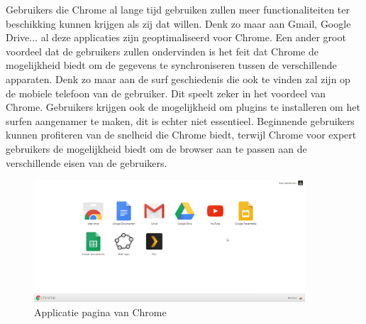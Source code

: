 \documentclass[12pt]{article}
\begin{document}
\newline
Gebruikers die Chrome al lange tijd gebruiken zullen meer functionaliteiten ter beschikking kunnen krijgen als zij dat willen. Denk zo maar aan Gmail, Google Drive... al deze applicaties zijn geoptimaliseerd voor Chrome. Een ander groot voordeel dat de gebruikers zullen ondervinden is het feit dat Chrome de mogelijkheid biedt om de gegevens te synchroniseren tussen de verschillende apparaten. Denk zo maar aan de surf geschiedenis die ook te vinden zal zijn op de mobiele telefoon van de gebruiker. Dit speelt zeker in het voordeel van Chrome. Gebruikers krijgen ook de mogelijkheid om plugins te installeren om het surfen aangenamer te maken, dit is echter niet essentieel. Beginnende gebruikers kunnen profiteren van de snelheid die Chrome biedt, terwijl Chrome voor expert gebruikers de mogelijkheid biedt om de browser aan te passen aan de verschillende eisen van de gebruikers.
\begin{figure}
  \centering
    \includegraphics[width=0.9\textwidth]{apps.png}
  \caption{Applicatie pagina van Chrome}
  \label{fig:apps}
\end{figure}
\newpage
\end{document}
